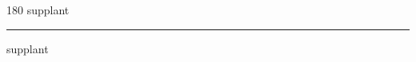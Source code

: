 
\begin{frame}
\begin{center}
\begin{turn}{180}
{\fontsize{2.5cm}{1em}\selectfont supplant}
\end{turn}
\vspace{1em}\par  
\hrule
\vspace{1em}\par  
{\fontsize{2.5cm}{1em}\selectfont supplant}
\end{center}
\end{frame}
